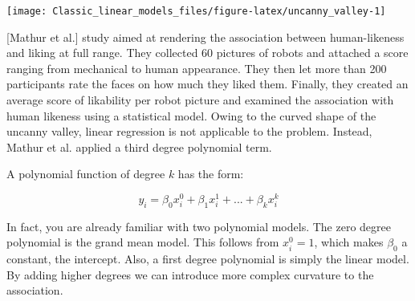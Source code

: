 \documentclass[]{svmono}
\begin{document}
\texttt{[image: Classic\_linear\_models\_files/figure-latex/uncanny\_valley-1]}

{[}Mathur et al.{]} study aimed at rendering the association between
human-likeness and liking at full range. They collected 60 pictures of
robots and attached a score ranging from mechanical to human appearance.
They then let more than 200 participants rate the faces on how much they
liked them. Finally, they created an average score of likability per
robot picture and examined the association with human likeness using a
statistical model. Owing to the curved shape of the uncanny valley,
linear regression is not applicable to the problem. Instead, Mathur et
al. applied a third degree polynomial term.

A polynomial function of degree \(k\) has the form:

\[y_i = \beta_0 x_i^0 + \beta_1 x_i^1 + ... + \beta_{k}  x_i^{k}\]

In fact, you are already familiar with two polynomial models. The zero
degree polynomial is the grand mean model. This follows from
\(x_i^0 = 1\), which makes \(\beta_0\) a constant, the intercept. Also,
a first degree polynomial is simply the linear model. By adding higher
degrees we can introduce more complex curvature to the association.
\end{document}
